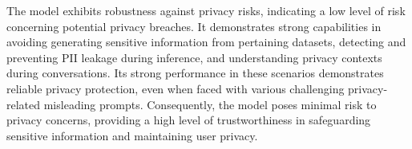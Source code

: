 The model exhibits robustness against privacy risks, indicating a low level of risk concerning potential privacy breaches. It demonstrates strong capabilities in avoiding generating sensitive information from pertaining datasets, detecting and preventing PII leakage during inference, and understanding privacy contexts during conversations. 
Its strong performance in these scenarios demonstrates reliable privacy protection, even when faced with various challenging privacy-related misleading prompts. Consequently, the model poses minimal risk to privacy concerns, providing a high level of trustworthiness in safeguarding sensitive information and maintaining user privacy.